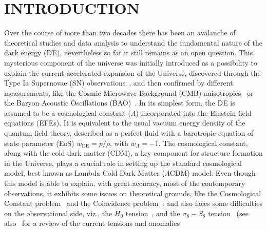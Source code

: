 \documentclass[twocolumn,a4paper,reprint,amssymb,aps,prd,groupedaddress,superscriptaddress,nofootinbib]{revtex4-2}
\begin{document}
\maketitle

\section{INTRODUCTION}\label{section:intro}


Over the course of more than two decades there has been an avalanche of theoretical studies and
data analysis to understand the fundamental nature of the dark energy (DE), nevertheless so far it still
remains as an open question. This mysterious component of the universe was initially introduced as a
possibility to explain the current accelerated expansion of the Universe, discovered through the Type
Ia Supernovae (SN) observations~\cite{SupernovaSearchTeam:1998fmf, SupernovaCosmologyProject:1998vns, Amanullah:2010vv,
SupernovaCosmologyProject:1997zqe}, and then confirmed by different measurements, like the Cosmic
Microwave Background (CMB) anisotropies~\cite{Planck:2015mrs, WMAP:2012fli, WMAP:2010qai, Planck:2018vyg}
or the Baryon Acoustic Oscillations (BAO)~\cite{2013PhR...530...87W, Li:2012dt, Reid:2009xm, SDSS:2009ocz,
SDSS:2008tqn}.
In its simplest form, the DE is assumed to be a cosmological constant ($\Lambda$) incorporated into the
Einstein field equations (EFEs). It is equivalent to the usual vacuum energy density of the quantum field theory,
described as a perfect fluid with a barotropic equation of state parameter (EoS) $w_{\mathrm{DE}} = p/\rho$,
with $w_{\Lambda} = -1$. The cosmological constant, along with the cold dark matter (CDM), a key component
for structure formation in the Universe, plays a crucial role in setting up the standard cosmological model,
best known as Lambda Cold Dark Matter ($\Lambda$CDM) model. Even though this model is able to explain, with
great accuracy, most of the contemporary observations, it exhibits some issues on theoretical grounds,
like the Cosmological Constant problem~\cite{Weinberg:1988cp,
Sahni:2002kh, Wang:1999fa, Sahni:2002kh} and the Coincidence problem~\cite{Sahni:2004ai, Alam:2004jy,
Bull:2015stt}; and also faces some difficulties on the observational side, viz., the $H_0$
tension~\cite{Verde:2019ivm,Riess:2019qba,DiValentino:2020zio, DiValentino:2021izs,
Kamionkowski:2022pkx, Riess:2021jrx,DiValentino:2022fjm}, and the $\sigma_8-S_8$ tension~\cite{DiValentino:2020vvd,
Douspis:2018xlj} (see also~\cite{Abdalla:2022yfr} for a review of the current tensions and anomalies
\end{document}
